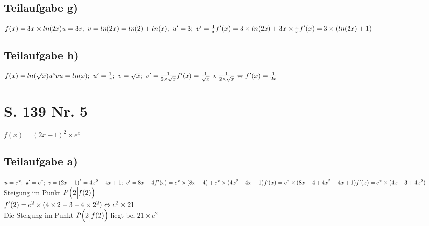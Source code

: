 \documentclass[11pt, a4paper]{report}
\begin{document}
	\section{Teilaufgabe g)}
	$
	f(x) = 3x \times ln(2x) \\
	u = 3x;\ v = ln(2x) = ln(2) + ln(x);\ u' = 3;\ v' = \frac{1}{x} \\
	f'(x) = 3 \times ln(2x) + 3x \times \frac{1}{x} \\
	f'(x) = 3 \times (ln(2x) + 1)
	$
	
	\section{Teilaufgabe h)}
	$
	f(x) = ln(\sqrt{x}) \\
	u^\circ v\\
	u = ln(x);\ u' = \frac{1}{x};\ v = \sqrt{x};\ v' = \frac{1}{2 \times \sqrt{x}} \\
	f'(x) = \frac{1}{\sqrt{x}} \times \frac{1}{2 \times \sqrt{x}} \\
	\Leftrightarrow f'(x) = \frac{1}{2x}
	$
	
	\chapter{S. 139 Nr. 5}
	$
	f(x) = (2x - 1)^2 \times e^x
	$
	\section{Teilaufgabe a)}
	$
	u = e^x;\ u' = e^x;\ v = (2x - 1)^2 = 4x^2 - 4x + 1;\ v' = 8x - 4 \\
	f'(x) = e^x \times (8x - 4) + e^x \times (4x^2 - 4x + 1) \\
	f'(x) = e^x \times (8x - 4 + 4x^2 - 4x + 1) \\
	f'(x) = e^x \times (4x - 3 + 4x^2) \\
	$
	\\
	Steigung im Punkt $P\Bigl(2\Bigl|f(2)\Bigl)$ \\
	$
	f'(2) = e^2 \times (4 \times 2  - 3 + 4\times 2^2) \\
	\Leftrightarrow e^2 \times 21 \\
	$ \\
	Die Steigung im Punkt $P\Bigl(2\Bigl|f(2)\Bigl)$ liegt bei $21 \times e^2$
	\\
\end{document}
